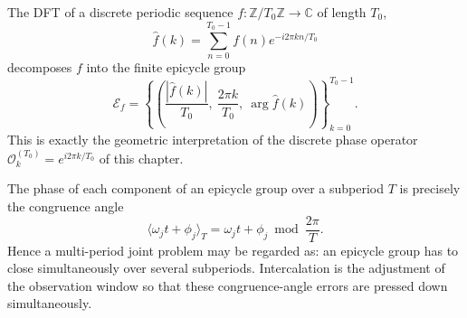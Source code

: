 \begin{example}\label{ex:dft_epicycle}
The DFT of a discrete periodic sequence $f:\mathbb{Z}/T_0\mathbb{Z}\to\mathbb{C}$ of length $T_0$,
\[
\hat f(k)=\sum_{n=0}^{T_0-1}f(n)e^{-i2\pi kn/T_0}
\]
decomposes $f$ into the finite epicycle group
\[
\mathcal{E}_f=\left\{\left(\frac{|\hat f(k)|}{T_0},\ \frac{2\pi k}{T_0},\ \arg \hat f(k)\right)\right\}_{k=0}^{T_0-1}.
\]
This is exactly the geometric interpretation of the discrete phase operator $\mathcal{O}_k^{(T_0)}=e^{i2\pi k/T_0}$ of this chapter.
\end{example}

\begin{remark}\label{rem:epicycle_congruence}
The phase of each component of an epicycle group over a subperiod $T$ is precisely the congruence angle
\[
\langle \omega_j t+\phi_j\rangle_T
=\omega_j t+\phi_j\bmod \frac{2\pi}{T}.
\]
Hence a multi-period joint problem may be regarded as: an epicycle group has to close simultaneously over several subperiods. Intercalation is the adjustment of the observation window so that these congruence-angle errors are pressed down simultaneously.
\end{remark}

